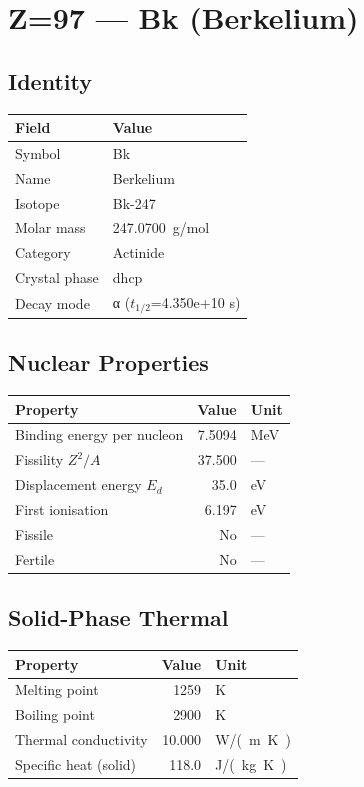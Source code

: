 \documentclass[11pt,a4paper]{article}
\begin{document}
\newpage

\section{Z=97 --- Bk (Berkelium)}
\label{sec:Z97}

\subsection{Identity}
\begin{tabular}{ll}
  \toprule
  Field & Value \\
  \midrule
  Symbol & Bk \\
  Name & Berkelium \\
  Isotope & Bk-247 \\
  Molar mass & \SI{247.0700}{g/mol} \\
  Category & Actinide \\
  Crystal phase & dhcp \\
  Decay mode & α ($t_{1/2}$=4.350e+10 s) \\
  \bottomrule
\end{tabular}

\subsection{Nuclear Properties}
\begin{tabular}{lrl}
  \toprule
  Property & Value & Unit \\
  \midrule
  Binding energy per nucleon & 7.5094 & \si{MeV} \\
  Fissility $Z^2/A$ & 37.500 & --- \\
  Displacement energy $E_d$ & 35.0 & \si{eV} \\
  First ionisation & 6.197 & \si{eV} \\
  Fissile & No & --- \\
  Fertile & No & --- \\
  \bottomrule
\end{tabular}

\subsection{Solid-Phase Thermal}
\begin{tabular}{lrl}
  \toprule
  Property & Value & Unit \\
  \midrule
  Melting point & 1259 & \si{K} \\
  Boiling point & 2900 & \si{K} \\
  Thermal conductivity & 10.000 & \si{W/(m.K)} \\
  Specific heat (solid) & 118.0 & \si{J/(kg.K)} \\
  \bottomrule
\end{tabular}
\end{document}
